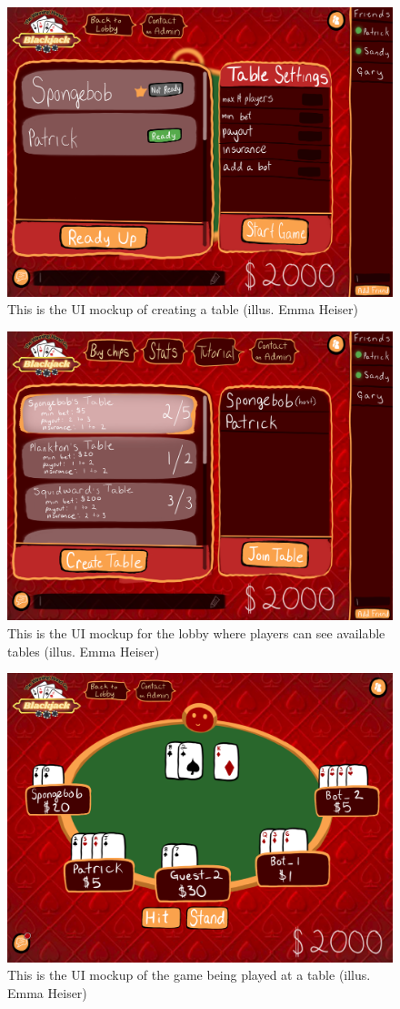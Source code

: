 \begin{figure}[H]
    \centering
    \includegraphics[width=0.75\linewidth]{figures/at-table.png}
    \caption{This is the UI mockup of creating a table (illus. Emma Heiser)}
    \label{fig:table}
\end{figure}

\begin{figure}[H]
    \centering
    \includegraphics[width=0.75\linewidth]{figures/lobby.png}
    \caption{This is the UI mockup for the lobby where players can see available tables (illus. Emma Heiser)}
    \label{fig:lobby}
\end{figure}

\begin{figure}[H]
    \centering
    \includegraphics[width=0.75\linewidth]{figures/in-game.png}
    \caption{This is the UI mockup of the game being played at a table (illus. Emma Heiser)}
    \label{fig:game}
\end{figure}

\pagebreak
